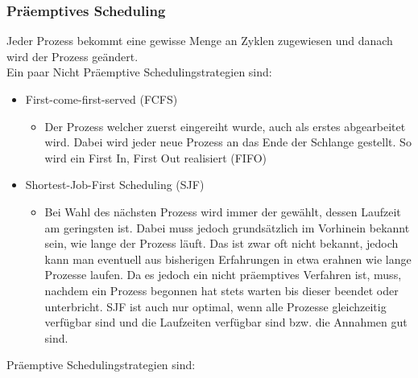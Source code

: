 \documentclass{article}
\begin{document}
	\subsubsection{Präemptives Scheduling}
	Jeder Prozess bekommt eine gewisse Menge an Zyklen zugewiesen und danach wird der Prozess geändert. \\
	Ein paar Nicht Präemptive Schedulingstrategien sind:
	\begin{itemize}
		\item{First-come-first-served (FCFS)}
		\begin{itemize}
			\item{Der Prozess welcher zuerst eingereiht wurde, auch als erstes abgearbeitet wird. Dabei wird jeder neue Prozess an das Ende der Schlange gestellt. So wird ein First In, First Out realisiert (FIFO)}
		\end{itemize}
		\item{Shortest-Job-First Scheduling (SJF)}
		\begin{itemize}
			\item{Bei Wahl des nächsten Prozess wird immer der gewählt, dessen Laufzeit am geringsten ist. Dabei muss jedoch grundsätzlich im Vorhinein bekannt sein, wie lange der Prozess läuft. Das ist zwar oft nicht bekannt, jedoch kann man eventuell aus bisherigen Erfahrungen in etwa erahnen wie lange Prozesse laufen. Da es jedoch ein nicht präemptives Verfahren ist, muss, nachdem ein Prozess begonnen hat stets warten bis dieser beendet oder unterbricht. SJF ist auch nur optimal, wenn alle Prozesse gleichzeitig verfügbar sind und die Laufzeiten verfügbar sind bzw. die Annahmen gut sind.}
		\end{itemize}
	\end{itemize}
	Präemptive Schedulingstrategien sind:
\end{document}
